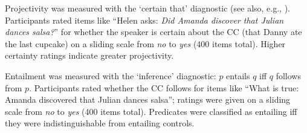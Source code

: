 \documentclass[12pt,fleqn]{article}
\newcommand{\6}{\mbox{$[\hspace*{-.6mm}[$}}
\newcommand{\9}{\mbox{$]\hspace*{-.6mm}]$}}
\begin{document}
 Projectivity was measured with the `certain that' diagnostic (see also, e.g., \cite{tonhauser-salt26,tbd-variability}). Participants rated items like ``Helen asks: \emph{Did Amanda discover that Julian dances salsa?}'' for whether the speaker is certain about the CC (that Danny ate the last cupcake) on a sliding scale from \emph{no} to \emph{yes} (400 items total). Higher certainty ratings indicate greater projectivity.  

 Entailment was measured with the `inference' diagnostic: $p$ entails $q$ iff $q$ follows from $p$. %
Participants rated whether the CC follows for items like ``What is true: Amanda discovered that Julian dances salsa''; ratings were given on a sliding scale from \emph{no} to \emph{yes} (400 items total). Predicates were classified as entailing iff they were  indistinguishable from entailing controls. 
\end{document}
